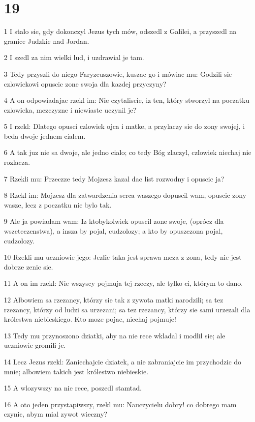 \chapter{19}

\par 1 I stalo sie, gdy dokonczyl Jezus tych mów, odszedl z Galilei, a przyszedl na granice Judzkie nad Jordan.
\par 2 I szedl za nim wielki lud, i uzdrawial je tam.
\par 3 Tedy przyszli do niego Faryzeuszowie, kuszac go i mówiac mu: Godzili sie czlowiekowi opuscic zone swoja dla kazdej przyczyny?
\par 4 A on odpowiadajac rzekl im: Nie czytaliscie, iz ten, który stworzyl na poczatku czlowieka, mezczyzne i niewiaste uczynil je?
\par 5 I rzekl: Dlatego opusci czlowiek ojca i matke, a przylaczy sie do zony swojej, i beda dwoje jednem cialem.
\par 6 A tak juz nie sa dwoje, ale jedno cialo; co tedy Bóg zlaczyl, czlowiek niechaj nie rozlacza.
\par 7 Rzekli mu: Przeczze tedy Mojzesz kazal dac list rozwodny i opuscic ja?
\par 8 Rzekl im: Mojzesz dla zatwardzenia serca waszego dopuscil wam, opuscic zony wasze, lecz z poczatku nie bylo tak.
\par 9 Ale ja powiadam wam: Iz ktobykolwiek opuscil zone swoje, (oprócz dla wszeteczenstwa), a insza by pojal, cudzolozy; a kto by opuszczona pojal, cudzolozy.
\par 10 Rzekli mu uczniowie jego: Jezlic taka jest sprawa meza z zona, tedy nie jest dobrze zenic sie.
\par 11 A on im rzekl: Nie wszyscy pojmuja tej rzeczy, ale tylko ci, którym to dano.
\par 12 Albowiem sa rzezancy, którzy sie tak z zywota matki narodzili; sa tez rzezancy, którzy od ludzi sa urzezani; sa tez rzezancy, którzy sie sami urzezali dla królestwa niebieskiego. Kto moze pojac, niechaj pojmuje!
\par 13 Tedy mu przynoszono dziatki, aby na nie rece wkladal i modlil sie; ale uczniowie gromili je.
\par 14 Lecz Jezus rzekl: Zaniechajcie dziatek, a nie zabraniajcie im przychodzic do mnie; albowiem takich jest królestwo niebieskie.
\par 15 A wlozywszy na nie rece, poszedl stamtad.
\par 16 A oto jeden przystapiwszy, rzekl mu: Nauczycielu dobry! co dobrego mam czynic, abym mial zywot wieczny?
